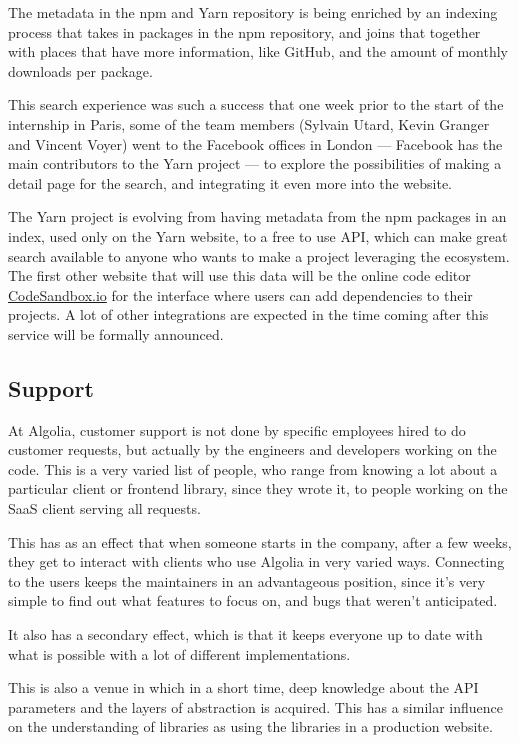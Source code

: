 The metadata in the npm and Yarn repository is being enriched by an indexing process\cite{npm-search} that takes in packages in the npm repository, and joins that together with places that have more information, like GitHub, and the amount of monthly downloads per package.

This search experience was such a success that one week prior to the start of the internship in Paris, some of the team members (Sylvain Utard, Kevin Granger and Vincent Voyer) went to the Facebook offices in London --- Facebook has the main contributors to the Yarn project --- to explore the possibilities of making a detail page for the search, and integrating it even more into the website.

The Yarn project is evolving from having metadata from the npm packages in an index, used only on the Yarn website, to a free to use API, which can make great search available to anyone who wants to make a project leveraging the ecosystem. The first other website that will use this data will be the online code editor \href{https://codesandbox.io}{CodeSandbox.io} for the interface where users can add dependencies to their projects. A lot of other integrations are expected in the time coming after this service will be formally announced.

\subsection{Support}
\label{support}

At Algolia, customer support is not done by specific employees hired to do customer requests, but actually by the engineers and developers working on the code. This is a very varied list of people, who range from knowing a lot about a particular client or frontend library, since they wrote it, to people working on the SaaS client serving all requests.

This has as an effect that when someone starts in the company, after a few weeks, they get to interact with clients who use Algolia in very varied ways. Connecting to the users keeps the maintainers in an advantageous position, since it's very simple to find out what features to focus on, and bugs that weren't anticipated.

It also has a secondary effect, which is that it keeps everyone up to date with what is possible with a lot of different implementations.

This is also a venue in which in a short time, deep knowledge about the API parameters and the layers of abstraction is acquired. This has a similar influence on the understanding of libraries as using the libraries in a production website.

